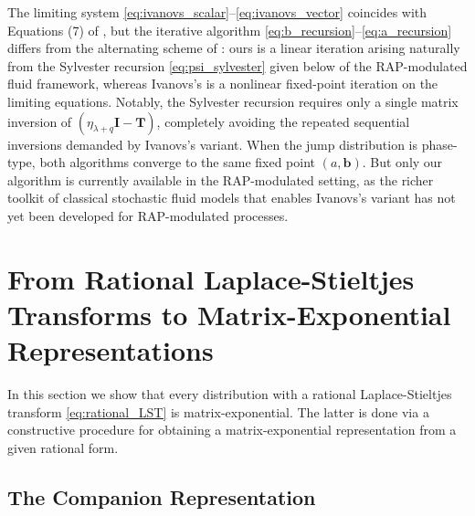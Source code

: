 \documentclass[a4paper,11pt]{article}
\numberwithin{equation}{section}
\theoremstyle{plain}
\newtheorem{lemma}[theorem]{Lemma}
\theoremstyle{definition}
\newcommand{\1}{\mathbf{1}}
\begin{document}
The limiting system \eqref{eq:ivanovs_scalar}--\eqref{eq:ivanovs_vector} coincides with Equations (7) of \cite{Ivanovs2021}, but the iterative algorithm \eqref{eq:b_recursion}--\eqref{eq:a_recursion} differs from the alternating scheme of \cite[Section 4.2]{Ivanovs2021}: ours is a linear iteration arising naturally from the Sylvester recursion \eqref{eq:psi_sylvester} given below of the RAP-modulated fluid framework, whereas Ivanovs's is a nonlinear fixed-point iteration on the limiting equations. Notably, the Sylvester recursion requires only a single matrix inversion of $(\eta_{\lambda+q}\bm{I} - \bm{T})$, completely avoiding the repeated sequential inversions demanded by Ivanovs's variant. When the jump distribution is phase-type, both algorithms converge to the same fixed point $(a,\bm{b})$. But only our algorithm is currently available in the RAP-modulated setting, as the richer toolkit of classical stochastic fluid models that enables Ivanovs's variant has not yet been developed for RAP-modulated processes.





\section{From Rational Laplace-Stieltjes Transforms to Matrix-Exponential Representations}\label{sectionRationalToME}

In this section we show that
every distribution with a rational Laplace-Stieltjes transform  \eqref{eq:rational_LST} is matrix-exponential. 
The latter is done via a
constructive procedure for obtaining a matrix-exponential representation from a given rational form.

\subsection{The Companion Representation}
\end{document}
